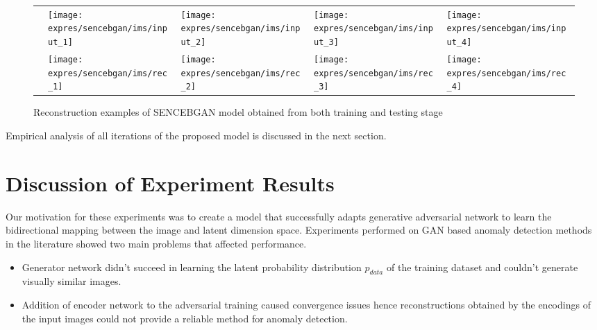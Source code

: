 \begin{figure}[!h]	
	\setlength\tabcolsep{1pt}
	\settowidth{}
	\begin{tabularx}{\linewidth}{l XXXX}
		\rothead{Image Samples}  & \texttt{[image: expres/sencebgan/ims/input\_1]}
		& \texttt{[image: expres/sencebgan/ims/input\_2]} &
		\texttt{[image: expres/sencebgan/ims/input\_3]} &
		\texttt{[image: expres/sencebgan/ims/input\_4]} \\
		\rothead{Reconstructions} & \texttt{[image: expres/sencebgan/ims/rec\_1]}
		& \texttt{[image: expres/sencebgan/ims/rec\_2]} &
		\texttt{[image: expres/sencebgan/ims/rec\_3]}
		&\texttt{[image: expres/sencebgan/ims/rec\_4]}
	\end{tabularx}
	\caption{Reconstruction examples of SENCEBGAN model obtained from both training and testing stage}\label{fig:sencebgan_reconstruction}
\end{figure}

Empirical analysis of all iterations of the proposed model is discussed in the next section.

\section{Discussion of Experiment Results}
\label{sec:exp_discuss}

Our motivation for these experiments was to create a model that successfully adapts generative
adversarial network to learn the bidirectional mapping between the image and latent dimension space.
Experiments performed on GAN based anomaly detection methods in the literature showed two main
problems that affected performance. 

\begin{itemize}
	\item {Generator network didn't succeed in learning the latent probability distribution
		$p_{data}$ of the training dataset and couldn't generate visually similar images.}
	\item {Addition of encoder network to the adversarial training caused convergence issues hence
		reconstructions obtained by the encodings of the input images could not provide a reliable
		method for anomaly detection.}
\end{itemize}

